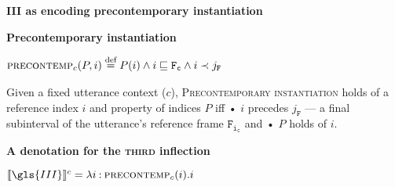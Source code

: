 \pex\textbf{\gls{III} as encoding precontemporary instantiation}\label{denoteIII}

\a\textbf{Precontemporary instantiation}

$\begin{aligned}\textsc{precontemp}_{c}(P,i)\overset{\text{def}}{=}\iffalse\quad\&\textsc{NfInst}(P,\mathtt{F},j_{\mathtt{F}})\\\fi
P(i)\wedge i\sqsubseteq\mathtt{F_c}\wedge i\prec j_{\mathtt{F}}\end{aligned}$


Given a fixed utterance context ($ c $), \textsc{Precontemporary instantiation} holds of a reference index $ i $ and property of indices $ P $ iff • $ i $ precedes $ j_{\mathtt{F}} $ --- a final subinterval of the utterance's reference frame $ \mathtt{F_{i_c}} $ and • $ P $ holds of $ i $.

\a \textbf{A denotation for the \textsc{third} inflection}

$\denote[c]{\gls{III}}=\lambda i\mathbin{:}\textsc{precontemp}_c(i).i$

\xe







%
%
%





